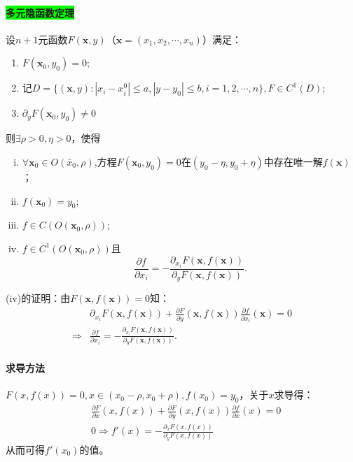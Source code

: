 \documentclass[UTF8]{ctexart}
\begin{document}
    \paragraph{\colorbox{lime}{多元隐函数定理}}设$n+1$元函数$F(\boldsymbol{x},y)$（$\boldsymbol{x}=(x_1,x_2,\cdots,x_n)$）满足：
    \begin{enumerate}[(1)]
        \item $F(\boldsymbol{x}_0,y_0)=0$;
        \item 记$D=\{(\boldsymbol{x},y):|x_i-x_i^0|\le a,|y-y_0|\le b,i=1,2,\cdots,n\},F\in C^1(D)$;
        \item $\partial_yF(\boldsymbol{x}_0,y_0)\not=0$
    \end{enumerate}
    则$\exists\rho>0,\eta>0$，使得
    \begin{enumerate}[(i)]
        \item $\forall\boldsymbol{x}_0\in O(\bar{x}_0,\rho)$,方程$F(\boldsymbol{x}_0,y_0)=0$在$(y_0-\eta,y_0+\eta)$中存在唯一解$f(\boldsymbol{x})$；
        \item $f(\boldsymbol{x}_0)=y_0$;
        \item $f\in C(O(\boldsymbol{x}_0,\rho))$;
        \item $f\in C^1(O(\boldsymbol{x}_0,\rho))$且$$\frac{\partial f}{\partial x_i}=-\frac{\partial_{x_i}F(\boldsymbol{x},f(\boldsymbol{x}))}{\partial_yF(\boldsymbol{x},f(\boldsymbol{x}))}.$$
    \end{enumerate}
    \vspace{1ex}
    (iv)的证明：由$F(\boldsymbol{x},f(\boldsymbol{x}))=0$知：
    \begin{align*}
        &\partial_{x_i}F(\boldsymbol{x},f(\boldsymbol{x}))+\frac{\partial F}{\partial y}(\boldsymbol{x},f(\boldsymbol{x}))\frac{\partial f}{\partial x_i}(\boldsymbol{x})=0\\
        \Rightarrow &\frac{\partial f}{\partial x_i}=-\frac{\partial_{x_i}F(\boldsymbol{x},f(\boldsymbol{x}))}{\partial_yF(\boldsymbol{x},f(\boldsymbol{x}))}.
    \end{align*}

    \paragraph{\colorbox{cyan!70}{求导方法}}$F(x,f(x))=0,x\in(x_0-\rho,x_0+\rho),f(x_0)=y_0$，关于$x$求导得：
    \begin{align}
        &\frac{\partial F}{\partial x}(x,f(x))+\frac{\partial F}{\partial y}(x,f(x))\frac{\partial f}{\partial x}(x)=0\label{1}\\
        &0\Rightarrow f'(x)=-\frac{\partial_{x}F(x,f(x))}{\partial_yF(x,f(x))}\label{2}
    \end{align}
    从而可得$f'(x_0)$的值。
\end{document}
